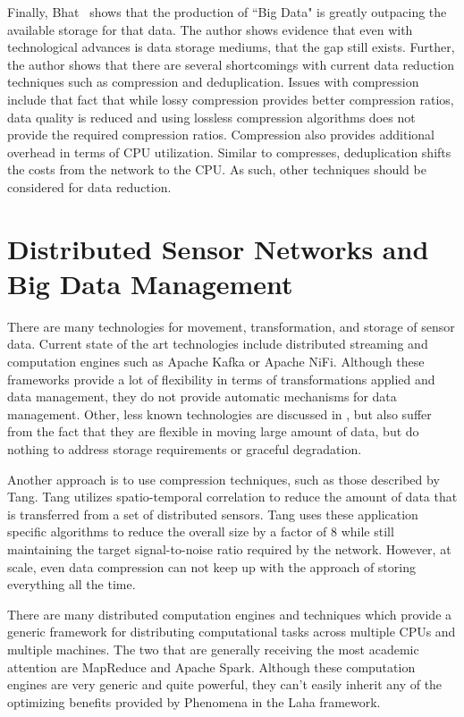 Finally, Bhat~\cite{bhat2018data} shows that the production of ``Big Data" is greatly outpacing the available storage for that data. The author shows evidence that even with technological advances is data storage mediums, that the gap still exists. Further, the author shows that there are several shortcomings with current data reduction techniques such as compression and deduplication. Issues with compression include that fact that while lossy compression provides better compression ratios, data quality is reduced and using lossless compression algorithms does not provide the required compression ratios. Compression also provides additional overhead in terms of CPU utilization. Similar to compresses, deduplication shifts the costs from the network to the CPU. As such, other techniques should be considered for data reduction.

\section{Distributed Sensor Networks and Big Data Management}\label{sec:distributed-sensor-networks-and-big-data-management}
There are many technologies for movement, transformation, and storage of sensor data. Current state of the art technologies include distributed streaming and computation engines such as Apache Kafka\cite{kreps2011kafka} or Apache NiFi\cite{noauthor_apache_nodate}. Although these frameworks provide a lot of flexibility in terms of transformations applied and data management, they do not provide automatic mechanisms for data management. Other, less known technologies are discussed in \cite{hughes2016survey}, but also suffer from the fact that they are flexible in moving large amount of data, but do nothing to address storage requirements or graceful degradation.

Another approach is to use compression techniques, such as those described by Tang\cite{tang2004compression}. Tang utilizes spatio-temporal correlation to reduce the amount of data that is transferred from a set of distributed sensors. Tang uses these application specific algorithms to reduce the overall size by a factor of 8 while still maintaining the target signal-to-noise ratio required by the network. However, at scale, even data compression can not keep up with the approach of storing everything all the time.

There are many distributed computation engines and techniques which provide a generic framework for distributing computational tasks across multiple CPUs and multiple machines. The two that are generally receiving the most academic attention are MapReduce\cite{dean2008mapreduce} and Apache Spark\cite{zaharia2016apache}. Although these computation engines are very generic and quite powerful, they can't easily inherit any of the optimizing benefits provided by Phenomena in the Laha framework.

